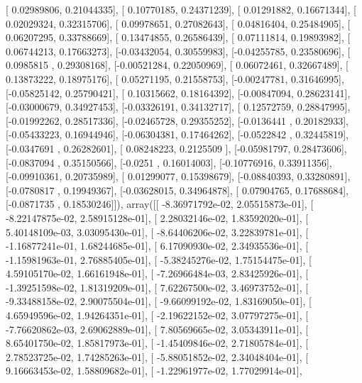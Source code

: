 \documentclass{article}
\begin{document}
       [ 0.02989806,  0.21044335],
       [ 0.10770185,  0.24371239],
       [ 0.01291882,  0.16671344],
       [ 0.02029324,  0.32315706],
       [ 0.09978651,  0.27082643],
       [ 0.04816404,  0.25484905],
       [ 0.06207295,  0.33788669],
       [ 0.13474855,  0.26586439],
       [ 0.07111814,  0.19893982],
       [ 0.06744213,  0.17663273],
       [-0.03432054,  0.30559983],
       [-0.04255785,  0.23580696],
       [ 0.0985815 ,  0.29308168],
       [-0.00521284,  0.22050969],
       [ 0.06072461,  0.32667489],
       [ 0.13873222,  0.18975176],
       [ 0.05271195,  0.21558753],
       [-0.00247781,  0.31646995],
       [-0.05825142,  0.25790421],
       [ 0.10315662,  0.18164392],
       [-0.00847094,  0.28623141],
       [-0.03000679,  0.34927453],
       [-0.03326191,  0.34132717],
       [ 0.12572759,  0.28847995],
       [-0.01992262,  0.28517336],
       [-0.02465728,  0.29355252],
       [-0.0136441 ,  0.20182933],
       [-0.05433223,  0.16944946],
       [-0.06304381,  0.17464262],
       [-0.0522842 ,  0.32445819],
       [-0.0347691 ,  0.26282601],
       [ 0.08248223,  0.2125509 ],
       [-0.05981797,  0.28473606],
       [-0.0837094 ,  0.35150566],
       [-0.0251    ,  0.16014003],
       [-0.10776916,  0.33911356],
       [-0.09910361,  0.20735989],
       [ 0.01299077,  0.15398679],
       [-0.08840393,  0.33280891],
       [-0.0780817 ,  0.19949367],
       [-0.03628015,  0.34964878],
       [ 0.07904765,  0.17688684],
       [-0.0871735 ,  0.18530246]]), array([[ -8.36971792e-02,   2.05515873e-01],
       [ -8.22147875e-02,   2.58915128e-01],
       [  2.28032146e-02,   1.83592020e-01],
       [  5.40148109e-03,   3.03095430e-01],
       [ -8.64406206e-02,   3.22839781e-01],
       [ -1.16877241e-01,   1.68244685e-01],
       [  6.17090930e-02,   2.34935536e-01],
       [ -1.15981963e-01,   2.76885405e-01],
       [ -5.38245276e-02,   1.75154475e-01],
       [  4.59105170e-02,   1.66161948e-01],
       [ -7.26966484e-03,   2.83425926e-01],
       [ -1.39251598e-02,   1.81319209e-01],
       [  7.62267500e-02,   3.46973752e-01],
       [ -9.33488158e-02,   2.90075504e-01],
       [ -9.66099192e-02,   1.83169050e-01],
       [  4.65949596e-02,   1.94264351e-01],
       [ -2.19622152e-02,   3.07797275e-01],
       [ -7.76620862e-03,   2.69062889e-01],
       [  7.80569665e-02,   3.05343911e-01],
       [  8.65401750e-02,   1.85817973e-01],
       [ -1.45409846e-02,   2.71805784e-01],
       [  2.78523725e-02,   1.74285263e-01],
       [ -5.88051852e-02,   2.34048404e-01],
       [  9.16663453e-02,   1.58809682e-01],
       [ -1.22961977e-02,   1.77029914e-01],
\end{document}
